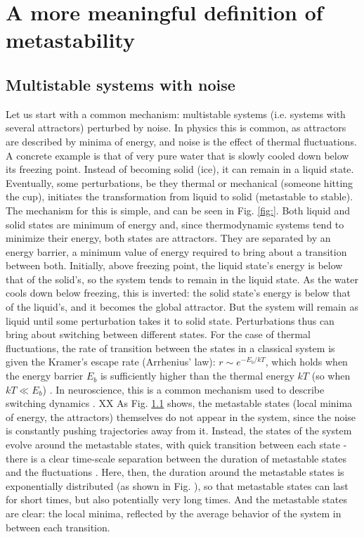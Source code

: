 \documentclass[preprint,superscriptaddress,showpacs,amsmath,amssymb,aps,pre,floatfix]{revtex4-1}
\theoremstyle{definition}
\begin{document}
\section{A more meaningful definition of metastability}

\subsection{Multistable systems with noise}
Let us start with a common mechanism: multistable systems (i.e. systems with several attractors) perturbed by noise. 
In physics this is common, as attractors are described by minima of energy, and noise is the effect of thermal fluctuations. A concrete example is that of very pure water that is slowly cooled down below its freezing point. Instead of becoming solid (ice), it can remain in a liquid state. Eventually, some perturbations, be they thermal or mechanical (someone hitting the cup), initiates the transformation from liquid to solid (metastable to stable). The mechanism for this is simple, and can be seen in Fig. \ref{fig:}. Both liquid and solid states are minimum of energy and, since thermodynamic systems tend to minimize their energy, both states are attractors. They are separated by an energy barrier, a minimum value of energy required to bring about a transition between both. Initially, above freezing point, the liquid state's energy is below that of the solid's, so the system tends to remain in the liquid state. As the water cools down below freezing, this is inverted: the solid state's energy is below that of the liquid's, and it becomes the global attractor. But the system will remain as liquid until some perturbation takes it to solid state. Perturbations thus can bring about switching between different states. For the case of thermal fluctuations, the rate of transition between the states in a classical system is given the Kramer's escape rate (Arrhenius' law): $r \sim e^{-E_b/kT}$, which holds when the energy barrier $E_b$ is sufficiently higher than the thermal energy $kT$ (so when $kT \ll E_b$) \cite{hangi1990reaction}.
In neuroscience, this is a common mechanism used to describe switching dynamics \cite{brinkman2022metastable}. XX 
As Fig. \ref{} shows, the metastable states (local minima of energy, the attractors) themselves do not appear in the system, since the noise is constantly pushing trajectories away from it. Instead, the states of the system evolve around the metastable states, with quick transition between each state - there is a clear time-scale separation between the duration of metastable states and the fluctuations \cite{hanggi1986escape}. Here, then, the duration around the metastable states is exponentially distributed (as shown in Fig. ), so that metastable states can last for short times, but also potentially very long times. And the metastable states are clear: the local minima, reflected by the average behavior of the system in between each transition.
\end{document}
